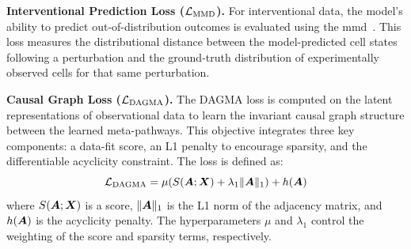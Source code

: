 \textbf{Interventional Prediction Loss ($\mathcal{L}_{\text{MMD}}$).}
For interventional data, the model's ability to predict out-of-distribution outcomes is evaluated using the \gls{mmd}~\cite{gretton2012kernel}.
This loss measures the distributional distance between the model-predicted cell states following a perturbation and the ground-truth distribution of experimentally observed cells for that same perturbation.

\textbf{Causal Graph Loss ($\mathcal{L}_{\text{DAGMA}}$).}
The DAGMA loss is computed on the latent representations of observational data to learn the invariant causal graph structure between the learned meta-pathways.
This objective integrates three key components: a data-fit score, an L1 penalty to encourage sparsity, and the differentiable acyclicity constraint.
The loss is defined as:
\begin{equation}
    \mathcal{L}_{\text{DAGMA}} = \mu(S({\bm{A}}; {\bm{X}}) + \lambda_1 \|{\bm{A}}\|_1) + h({\bm{A}})
    \label{eq:dagma_loss_full}
\end{equation}
where $S({\bm{A}}; {\bm{X}})$ is a score, $\|{\bm{A}}\|_1$ is the L1 norm of the adjacency matrix, and $h({\bm{A}})$ is the acyclicity penalty.
The hyperparameters $\mu$ and $\lambda_1$ control the weighting of the score and sparsity terms, respectively.

